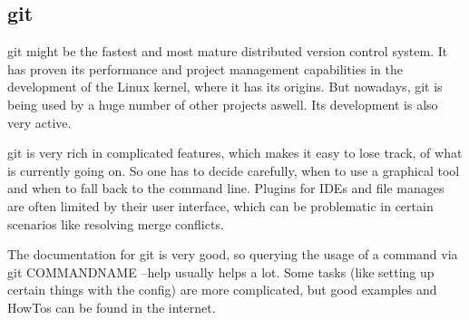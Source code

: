 		\subsection{git}
			git might be the fastest and most mature distributed version control system.
			It has proven its performance and project management capabilities in the development of the Linux kernel, where it has its origins.
			But nowadays, git is being used by a huge number of other projects aswell.
			Its development is also very active.

			git is very rich in complicated features, which makes it easy to lose track, of what is currently going on.
			So one has to decide carefully, when to use a graphical tool and when to fall back to the command line.
			Plugins for IDEs and file manages are often limited by their user interface, which can be problematic in certain scenarios like resolving merge conflicts.

			The documentation for git is very good, so querying the usage of a command via {\normalfont \ttfamily git COMMANDNAME --help} usually helps a lot.
			Some tasks (like setting up certain things with the config) are more complicated, but good examples and HowTos can be found in the internet.\\

